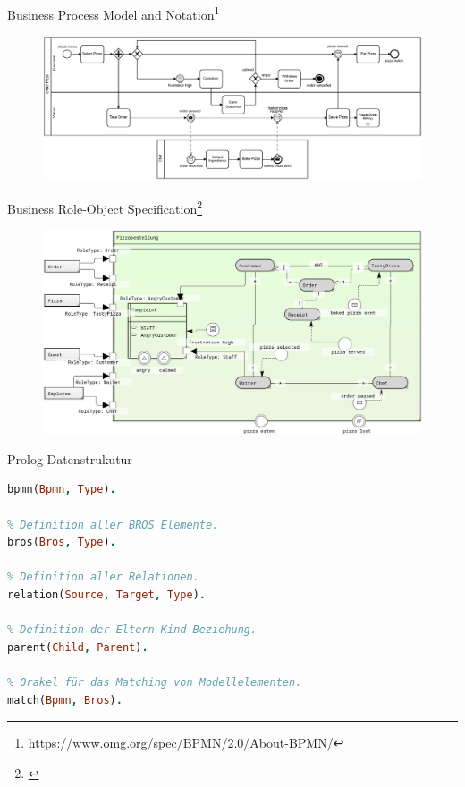 \begin{frame}{Business Process Model and Notation\footnote{\url{https://www.omg.org/spec/BPMN/2.0/About-BPMN/}}}
  \vspace{8pt}
  \begin{figure}
    \centering
    \begin{adjustbox}{width=1.1\linewidth,center}
      \includegraphics{images/example/bpmn.pdf}
    \end{adjustbox}
  \end{figure}
  \vspace{18.5pt}
\end{frame}
\begin{frame}{Business Role-Object Specification\footnote{\cite{Schoen}}}
  \begin{figure}
    \centering
    \begin{adjustbox}{width=0.9\linewidth,center}
      \includegraphics{images/example/bros-rule1.png}
    \end{adjustbox}
  \end{figure}
\end{frame}

\begin{frame}[fragile]{Prolog-Datenstrukutur}
\begin{lstlisting}[language=Prolog]
% Definition aller BPMN Elemente.
bpmn(Bpmn, Type).

% Definition aller BROS Elemente.
bros(Bros, Type).

% Definition aller Relationen.
relation(Source, Target, Type).

% Definition der Eltern-Kind Beziehung.
parent(Child, Parent).

% Orakel für das Matching von Modellelementen.
match(Bpmn, Bros).
\end{lstlisting}
\end{frame}

